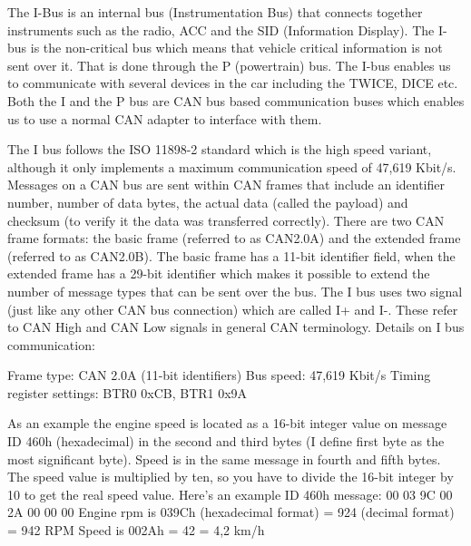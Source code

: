 \documentclass[11pt,a4paper]{book}
\begin{document}
The I-Bus is an internal bus (Instrumentation Bus) that connects together instruments such as the
radio, ACC and the SID (Information Display). The I-bus is the non-critical bus which means that
vehicle critical information is not sent over it. That is done through the P (powertrain) bus.
The I-bus enables us to communicate with several devices in the car including the TWICE, DICE etc.
Both the I and the P bus are CAN bus based communication buses which enables us to use a normal
CAN adapter to interface with them.

The I bus follows the ISO 11898-2 standard which is the high speed variant, although it only
implements a maximum communication speed of 47,619 Kbit/s. Messages on a CAN bus are sent
within CAN frames that include an identifier number, number of data bytes, the actual data (called the
payload) and checksum (to verify it the data was transferred correctly). There are two CAN frame
formats: the basic frame (referred to as CAN2.0A) and the extended frame (referred to as CAN2.0B).
The basic frame has a 11-bit identifier field, when the extended frame has a 29-bit identifier which
makes it possible to extend the number of message types that can be sent over the bus.
The I bus uses two signal (just like any other CAN bus connection) which are called I+ and I-. These
refer to CAN High and CAN Low signals in general CAN terminology.
Details on I bus communication:

Frame type: CAN 2.0A (11-bit identifiers)
Bus speed: 47,619 Kbit/s
Timing register settings: BTR0 0xCB, BTR1 0x9A

As an example the engine speed is located as a 16-bit integer value on message ID 460h
(hexadecimal) in the second and third bytes (I define first byte as the most significant byte). Speed is
in the same message in fourth and fifth bytes. The speed value is multiplied by ten, so you have to
divide the 16-bit integer by 10 to get the real speed value.
Here's an example ID 460h message: 00 03 9C 00 2A 00 00 00
Engine rpm is 039Ch (hexadecimal format) = 924 (decimal format) = 942 RPM
Speed is 002Ah = 42 = 4,2 km/h
\end{document}
